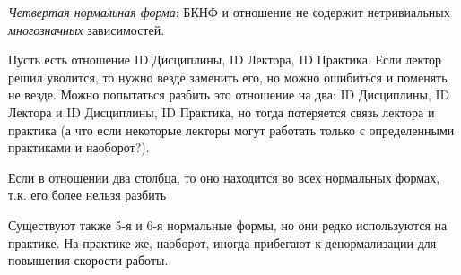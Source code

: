 \begin{definition}[4НФ]
  \textit{Четвертая нормальная форма}: БКНФ и отношение не содержит нетривиальных
  \textit{многозначных} зависимостей.
\end{definition}

\begin{example}
  Пусть есть отношение ID Дисциплины, ID Лектора, ID Практика. Если лектор решил
  уволится, то нужно везде заменить его, но можно ошибиться и поменять не везде.
  Можно попытаться разбить это отношение на два: ID Дисциплины, ID Лектора и ID
  Дисциплины, ID Практика, но тогда потеряется связь лектора и практика (а что
  если некоторые лекторы могут работать только с определенными практиками и
  наоборот?).
\end{example}

\begin{remark}
  Если в отношении два столбца, то оно находится во всех нормальных формах, т.к.
  его более нельзя разбить
\end{remark}

\begin{remark}
  Существуют также 5-я и 6-я нормальные формы, но они редко используются на
  практике. На практике же, наоборот, иногда прибегают к денормализации для
  повышения скорости работы.
\end{remark}
